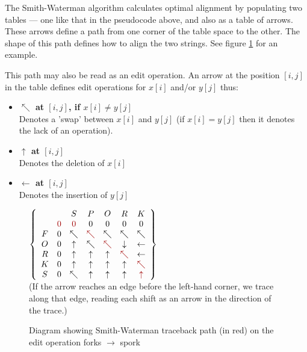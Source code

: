 The Smith-Waterman algorithm calculates optimal alignment by
populating two tables --- one like that in the pseudocode
above, and also as a table of arrows. These arrows define a
path from one corner of the table space to the other. The
shape of this path defines how to align the two
strings.\cite{Smith1981} See figure
\ref{fig:smith-waterman-traceback} for an example.

This path may also be read as an edit operation. An arrow at the
position $[i,j]$ in the table defines edit operations for $x[i]$
and/or $y[j]$ thus:
\begin{itemize}
\item \textbf{$\nwarrow$ at $[i,j]$, if $x[i] \neq y[j]$} \\ Denotes a
  'swap' between $x[i]$ and $y[j]$ (if $x[i] = y[j]$ then it denotes
  the lack of an operation).
\item \textbf{$\uparrow$ at $[i,j]$}\\Denotes the deletion of $x[i]$
\item \textbf{$\leftarrow$ at $[i,j]$}\\Denotes the insertion of
  $y[j]$
\end{itemize}

\begin{figure}[h]
  \centering $\left\{
  \begin{array}{ccccccc}
    & & S & P & O & R & K \\ & \color{red}{0} & \color{red}{0} & 0 & 0
    & 0 & 0 \\ F & 0 & \nwarrow & \color{red}{\nwarrow} & \nwarrow &
    \nwarrow & \nwarrow \\ O & 0 & \uparrow & \nwarrow &
    \color{red}{\nwarrow} & \downarrow & \leftarrow \\ R & 0 &
    \uparrow & \uparrow & \uparrow & \color{red}{\nwarrow} &
    \leftarrow \\ K & 0 & \uparrow & \uparrow & \uparrow & \uparrow &
    \color{red}{\nwarrow} \\ S & 0 & \nwarrow & \uparrow & \uparrow &
    \uparrow & \color{red}{\uparrow} \\
  \end{array}\right\} $\\
  (If the arrow reaches an edge before the left-hand corner, we trace
  along that edge, reading each shift as an arrow in the direction of
  the trace.)
  \caption{Diagram showing Smith-Waterman traceback path (in red) on
    the edit operation forks $\rightarrow$ spork}
  \label{fig:smith-waterman-traceback}
\end{figure}



